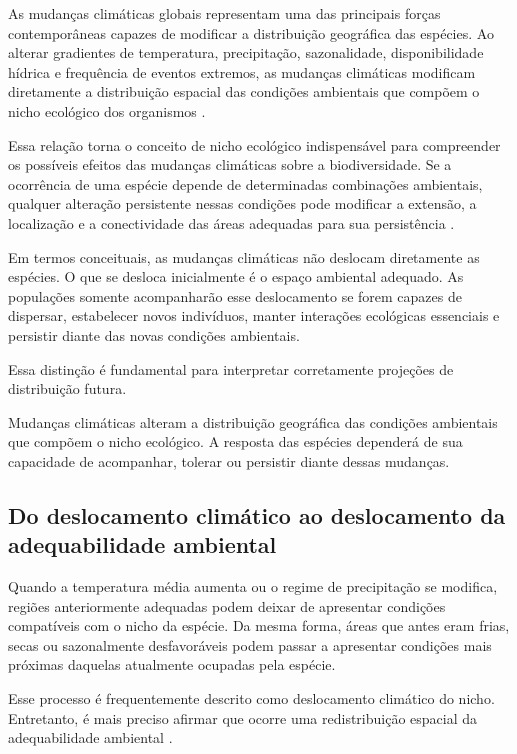 As mudanças climáticas globais representam uma das principais forças contemporâneas capazes de modificar a distribuição geográfica das espécies. Ao alterar gradientes de temperatura, precipitação, sazonalidade, disponibilidade hídrica e frequência de eventos extremos, as mudanças climáticas modificam diretamente a distribuição espacial das condições ambientais que compõem o nicho ecológico dos organismos \parencite{parmesan2006,ipcc2021}.

Essa relação torna o conceito de nicho ecológico indispensável para compreender os possíveis efeitos das mudanças climáticas sobre a biodiversidade. Se a ocorrência de uma espécie depende de determinadas combinações ambientais, qualquer alteração persistente nessas condições pode modificar a extensão, a localização e a conectividade das áreas adequadas para sua persistência \parencite{thuiller2005,araújo2006}.

Em termos conceituais, as mudanças climáticas não deslocam diretamente as espécies. O que se desloca inicialmente é o espaço ambiental adequado. As populações somente acompanharão esse deslocamento se forem capazes de dispersar, estabelecer novos indivíduos, manter interações ecológicas essenciais e persistir diante das novas condições ambientais.

Essa distinção é fundamental para interpretar corretamente projeções de distribuição futura.

\begin{conceito}
	Mudanças climáticas alteram a distribuição geográfica das condições ambientais que compõem o nicho ecológico. A resposta das espécies dependerá de sua capacidade de acompanhar, tolerar ou persistir diante dessas mudanças.
\end{conceito}

\subsection{Do deslocamento climático ao deslocamento da adequabilidade ambiental}

Quando a temperatura média aumenta ou o regime de precipitação se modifica, regiões anteriormente adequadas podem deixar de apresentar condições compatíveis com o nicho da espécie. Da mesma forma, áreas que antes eram frias, secas ou sazonalmente desfavoráveis podem passar a apresentar condições mais próximas daquelas atualmente ocupadas pela espécie.

Esse processo é frequentemente descrito como deslocamento climático do nicho. Entretanto, é mais preciso afirmar que ocorre uma redistribuição espacial da adequabilidade ambiental \parencite{guisan2017habitat}.

